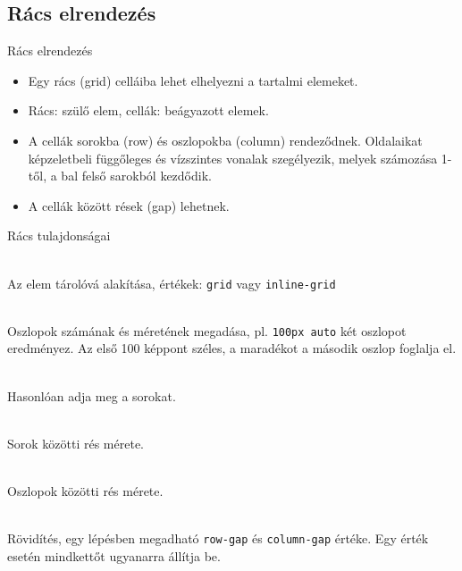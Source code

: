 \subsection{Rács elrendezés}

\begin{frame}
    Rács elrendezés
    \begin{itemize}
        \item Egy rács (grid) celláiba lehet elhelyezni a tartalmi elemeket. 
        \item Rács: szülő elem, cellák: beágyazott elemek.
        \item A cellák sorokba (row) és oszlopokba (column) rendeződnek. Oldalaikat képzeletbeli függőleges és vízszintes vonalak szegélyezik, melyek számozása 1-től, a bal felső sarokból kezdődik.
        \item A cellák között rések (gap) lehetnek.
    \end{itemize}
\end{frame}

\begin{frame}
    Rács tulajdonságai
    \footnotesize
    \begin{description}[m]
        \item[display] \hfill \\ Az elem tárolóvá alakítása, értékek: \texttt{grid} vagy \texttt{inline-grid}
        \item[grid-template-columns] \hfill \\ Oszlopok számának és méretének megadása, pl. \texttt{100px auto} két oszlopot eredményez. Az első 100 képpont széles, a maradékot a második oszlop foglalja el.
        \item[grid-template-rows] \hfill \\ Hasonlóan adja meg a sorokat.
        \item[row-gap] \hfill \\ Sorok közötti rés mérete.
        \item[column-gap] \hfill \\ Oszlopok közötti rés mérete.
        \item[gap] \hfill \\ Rövidítés, egy lépésben megadható \texttt{row-gap} és \texttt{column-gap} értéke. Egy érték esetén mindkettőt ugyanarra állítja be.   
    \end{description}
\end{frame}

